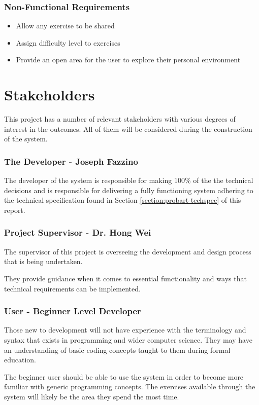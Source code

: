 \subsubsection{Non-Functional Requirements}
\begin{itemize}
    \item Allow any exercise to be shared
    \item Assign difficulty level to exercises
    \item Provide an open area for the user to explore their personal environment
\end{itemize}

\section{Stakeholders} \label{section:probart-stake}
This project has a number of relevant stakeholders with various degrees of interest in the outcomes. All of them will be considered during the construction of the system.

\subsubsection{The Developer - Joseph Fazzino}
The developer of the system is responsible for making 100\% of the the technical decisions and is responsible for delivering a fully functioning system adhering to the technical specification found in  Section \ref{section:probart-techspec} of this report.

\subsubsection{Project Supervisor - Dr. Hong Wei}
The supervisor of this project is overseeing the development and design process that is being undertaken. 

They provide guidance when it comes to essential functionality and ways that technical requirements can be implemented.

\subsubsection{User - Beginner Level Developer}
Those new to development will not have experience with the terminology and syntax that exists in programming and wider computer science. They may have an understanding of basic coding concepts taught to them during formal education.

The beginner user should be able to use the system in order to become more familiar with generic programming concepts. The exercises available through the system will likely be the area they spend the most time.


